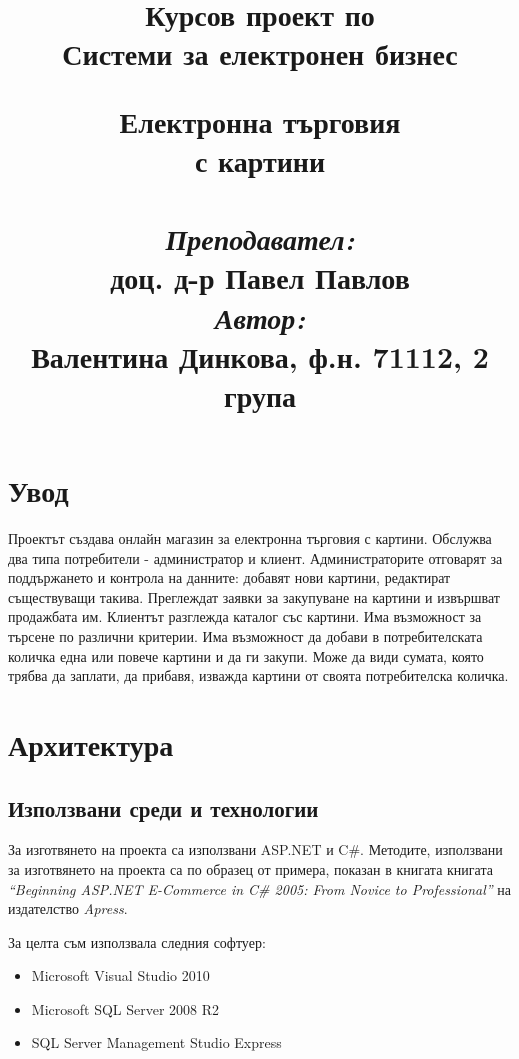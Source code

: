 \documentclass[a4paper,14pt]{article}
\title{
\vspace{2.0cm}
\begin{large}
Курсов проект по \\
Системи за електронен бизнес
\end{large}
\vspace{2.5cm}
\hline
\vspace{0.5cm}
\textbf{Електронна търговия
\\ \vspace{0.5cm} с картини}
\vspace{0.5cm}
\hline
\\ \vspace{2.5cm}
\\ \vspace{0.5cm}\Large{\textit{Преподавател:} \\ доц. д-р Павел Павлов}
\\ \vspace{1.0cm}\Large{\textit{Автор:} \\ Валентина Динкова, ф.н. 71112, 2 група}}
\begin{document}
\maketitle

\newpage

\tableofcontents

\newpage
\section{Увод}
Проектът създава онлайн магазин за електронна търговия с картини. Обслужва два типа потребители - администратор и клиент. Администраторите отговарят
за поддържането и контрола на данните: добавят нови картини, редактират съществуващи такива. Преглеждат заявки за закупуване на картини
и извършват продажбата им. Клиентът разглежда каталог със картини. Има възможност за
търсене по различни критерии. Има възможност да добави в потребителската количка една или повече картини и да ги закупи. Може да види сумата, която трябва да заплати, да прибавя, изважда картини от своята потребителска количка.


\section{Архитектура}


\subsection{Използвани среди и технологии}
За изготвянето на проекта са използвани ASP.NET и C\#. Методите, използвани за изготвянето на проекта са по образец от примера,
 показан в книгата книгата \textit{“Beginning ASP.NET E-Commerce in C\# 2005: From Novice to Professional”} на издателство \textit{Apress}.
 
 За целта съм използвала следния софтуер:
 \begin{itemize}
\item
Microsoft Visual Studio 2010
\item
Microsoft SQL Server 2008 R2
\item
SQL Server Management Studio Express
\end{itemize}
\end{document}
